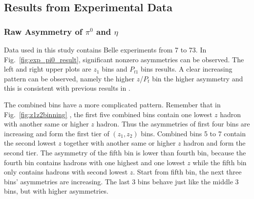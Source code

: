 \subsection{Results from Experimental Data}
\label{sec:resultsfromexp}
\subsubsection{\texorpdfstring{Raw Asymmetry of $\pi^0$ and $\eta$}{Raw Asymmetry of pi0 and eta}}
Data used in this study contains Belle experiments from 7 to 73. In Fig.~\ref{fig:exp_pi0_result}, significant nonzero asymmetries can be observed. The left and right upper plots are $z_1$ bins and $P_{t1}$ bins results. A clear increasing pattern can be observed, namely the higher $z$/$P_t$ bin the higher asymmetry and this is consistent with previous results in \cite{ChargedPionResult2}\cite{ChargedPionResult}.

The combined bins have a more complicated pattern. Remember that in Fig.~\ref{fig:z1z2binning} , the first five combined bins contain one lowest $z$ hadron with another same or higher $z$ hadron. Thus the asymmetries of first four bins are increasing and form the first tier of $(z_1,z_2)$ bins. Combined bins 5 to 7 contain the second lowest $z$ together with another same or higher $z$ hadron and form the second tier. The asymmetry of the fifth bin is lower than fourth bin, because the fourth bin contains hadrons with one highest and one lowest $z$ while the fifth bin only contains hadrons with second lowest $z$. Start from fifth bin, the next three bins' asymmetries are increasing. The last 3 bins behave just like the middle 3 bins, but with higher asymmetries. 

